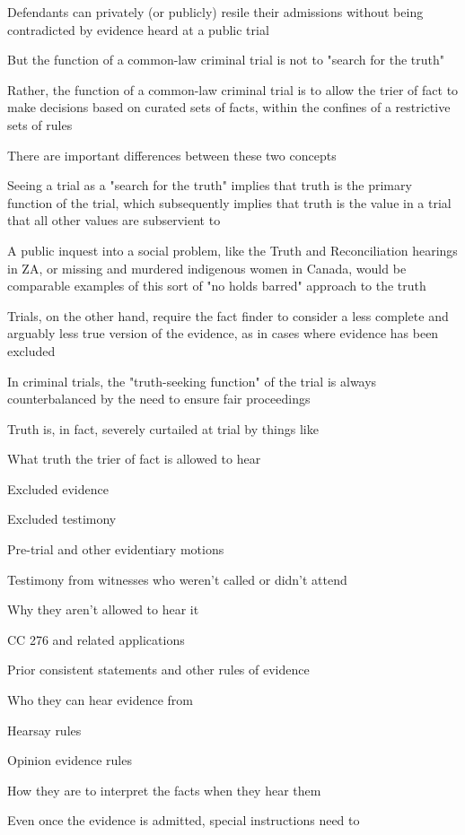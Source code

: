 Defendants can privately (or publicly) resile their admissions without being contradicted by evidence heard at a public trial

But the function of a common-law criminal trial is not to "search for the truth"

Rather, the function of a common-law criminal trial is to allow the trier of fact to make decisions based on curated sets of facts, within the confines of a restrictive sets of rules

There are important differences between these two concepts

Seeing a trial as a "search for the truth" implies that truth is the primary function of the trial, which subsequently implies that truth is the value in a trial that all other values are subservient to

A public inquest into a social problem, like the Truth and Reconciliation hearings in ZA, or missing and murdered indigenous women in Canada, would be comparable examples of this sort of "no holds barred" approach to the truth

Trials, on the other hand, require the fact finder to consider a less complete and arguably less true version of the evidence, as in cases where evidence has been excluded

In criminal trials, the "truth-seeking function" of the trial is always counterbalanced by the need to ensure fair proceedings

Truth is, in fact, severely curtailed at trial by things like

What truth the trier of fact is allowed to hear

Excluded evidence

Excluded testimony

Pre-trial and other evidentiary motions

Testimony from witnesses who weren't called or didn't attend

Why they aren't allowed to hear it

CC 276 and related applications

Prior consistent statements and other rules of evidence

Who they can hear evidence from

Hearsay rules

Opinion evidence rules

How they are to interpret the facts when they hear them

Even once the evidence is admitted, special instructions need to

